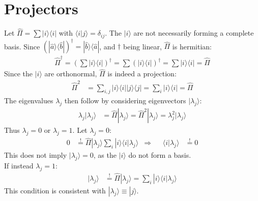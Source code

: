 \documentclass[english, parskip=full]{scrartcl}
\newcommand{\brak}{}
\newcommand{\kla}{}
\newcommand{\oper}{}
\newcommand{\Ket}{}
\begin{document}
\section{Projectors}
Let $\hat{\Pi}=\sum\oper | {i} \rangle\langle {i} |$ with $\brak\langle {i}| {j}\rangle=\delta_{ij}$. The $\Ket | {i} \rangle$ are not necessarily forming a complete basis.  Since $(\oper | {\hat{a}} \rangle\langle {\hat{b}} |)^\dagger=\oper | {\hat{b}} \rangle\langle {\hat{a}} |$, and $\dagger$ being linear, $\hat{\Pi}$ is hermitian:
\begin{align*}
\hat{\Pi}^\dagger = \kla\left( {\sum\oper | {i} \rangle\langle {i} |} \right)^\dagger=\sum\kla\left( {\oper | {i} \rangle\langle {i} |} \right)^\dagger=\sum\oper | {i} \rangle\langle {i} |=\hat{\Pi}
\end{align*}
Since the $\Ket | {i} \rangle$ are orthonormal, $\hat{\Pi}$ is indeed a projection:
\begin{align*}
\hat{\Pi}^2&=\sum_{i,j}\oper | {i} \rangle\langle {i} |\oper | {j} \rangle\langle {j} |=\sum_i\oper | {i} \rangle\langle {i} |=\hat{\Pi}
\end{align*}
The eigenvalues $\lambda_j$ then follow by considering eigenvectors $\Ket | {\lambda_j} \rangle$:
\begin{align*}
\lambda_j\Ket | {\lambda_j} \rangle&=\hat{\Pi}\Ket | {\lambda_j} \rangle=\hat{\Pi}^2\Ket | {\lambda_j} \rangle=\lambda_j^2\Ket | {\lambda_j} \rangle
\end{align*}
Thus $\lambda_j=0$ or $\lambda_j=1$. Let $\lambda_j=0$:
\begin{align*}
0&\overset{!}{=}\hat{\Pi}\Ket | {\lambda_j} \rangle\sum_i\oper | {i} \rangle\langle {i} |\lambda_j\rangle&\Rightarrow &&\brak\langle {i}| {\lambda_j}\rangle&\overset{!}{=}0
\end{align*}
This does not imply $\Ket | {\lambda_j} \rangle=0$, as the $\Ket | {i} \rangle$ do not form a basis.\\
If instead $\lambda_j=1$:
\begin{align*}
\Ket | {\lambda_j} \rangle&\overset{!}{=}\hat{\Pi}\Ket | {\lambda_j} \rangle=\sum_i\oper | {i} \rangle\langle {i} |\lambda_j\rangle
\end{align*}
This condition is consistent with $\Ket | {\lambda_j} \rangle\equiv\Ket | {j} \rangle$.
\end{document}
